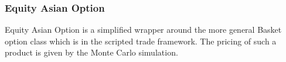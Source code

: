 \subsubsection{Equity Asian Option}
\label{pricing:eq_asianoption}

Equity Asian Option is a simplified wrapper around the more general Basket option class 
which is in the scripted trade framework. The pricing of such a product is given by the 
Monte Carlo simulation. 